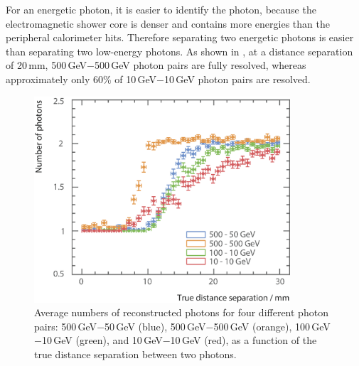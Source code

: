 For an energetic photon, it is easier to identify the photon, because the electromagnetic shower core is denser and contains more energies than the peripheral calorimeter hits. Therefore separating two energetic photons is easier than separating two low-energy photons. As shown in , at a distance separation of 20\,mm, 500\,GeV$-$500\,GeV photon pairs are fully resolved, whereas approximately only 60\% of 10\,GeV$-$10\,GeV photon pairs are resolved.

\begin{figure}[tbph]
\centering
        \includegraphics[width=0.85\textwidth]{photon/DoubleCompareEnergies2}
        \caption{Average numbers of reconstructed photons for four different photon pairs: 500\,GeV$-$50\,GeV (blue), 500\,GeV$-$500\,GeV (orange), 100\,GeV$-$10\,GeV (green), and 10\,GeV$-$10\,GeV (red), as a function of the true distance separation between two photons.}
        \label{fig:photonDoubleCompareEnergies}
\end{figure}

